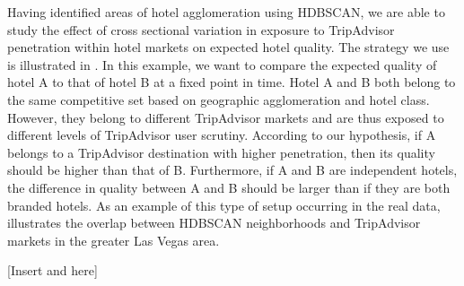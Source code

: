 \documentclass[mksc,blindrev]{informs3} %
\begin{document}
Having identified areas of hotel agglomeration using HDBSCAN, we are able to study the effect of cross sectional variation in exposure to TripAdvisor penetration within hotel markets on expected hotel quality. The strategy we use is illustrated in . In this example, we want to compare the expected quality of hotel A to that of hotel B at a fixed point in time. Hotel A and B both belong to the same competitive set based on geographic agglomeration and hotel class. However, they belong to different TripAdvisor markets and are thus exposed to different levels of TripAdvisor user scrutiny. According to our hypothesis, if A belongs to a TripAdvisor destination with higher penetration, then its quality should be higher than that of B. Furthermore, if A and B are independent hotels, the difference in quality between A and B should be larger than if they are both branded hotels. As an example of this type of setup occurring in the real data,  illustrates the overlap between HDBSCAN neighborhoods and TripAdvisor markets in the greater Las Vegas area.

[Insert  and  here]
\end{document}
